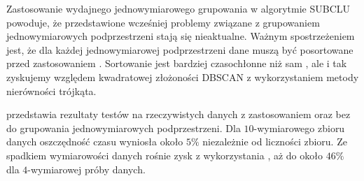 



Zastosowanie wydajnego jednowymiarowego grupowania w algorytmie SUBCLU powoduje, że przedstawione wcześniej problemy związane z grupowaniem jednowymiarowych podprzestrzeni stają się nieaktualne. Ważnym spostrzeżeniem jest, że dla każdej jednowymiarowej podprzestrzeni dane muszą być posortowane przed zastosowaniem . Sortowanie jest bardziej czasochłonne niż sam , ale i tak zyskujemy względem kwadratowej złożoności DBSCAN z wykorzystaniem metody nierówności trójkąta.\par
{} przedstawia rezultaty testów na rzeczywistych danych z zastosowaniem oraz bez  do grupowania jednowymiarowych podprzestrzeni. Dla $ 10 $-wymiarowego zbioru danych oszczędność czasu wyniosła około $ 5\% $ niezależnie od liczności zbioru. Ze spadkiem wymiarowości danych rośnie zysk z wykorzystania , aż do około $ 46\% $ dla $ 4 $-wymiarowej próby danych.